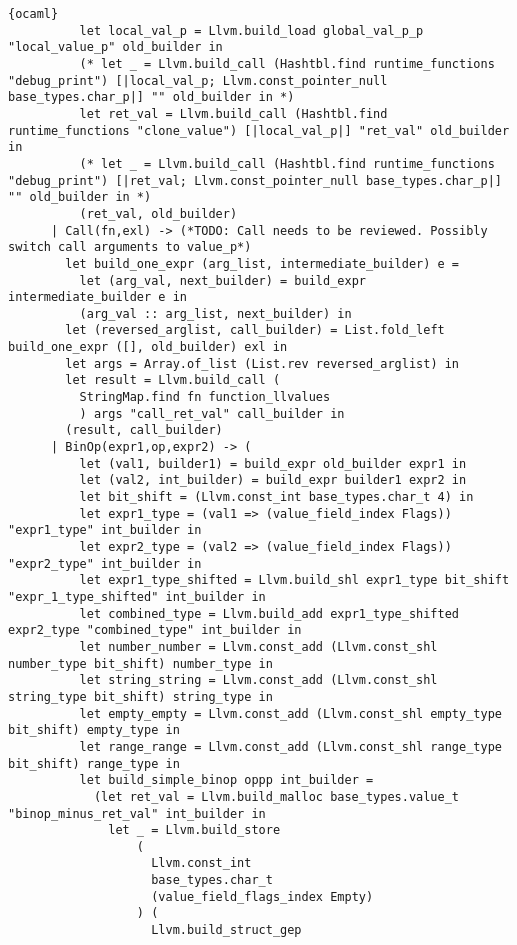 \begin{lstlisting}{ocaml}
          let local_val_p = Llvm.build_load global_val_p_p "local_value_p" old_builder in
          (* let _ = Llvm.build_call (Hashtbl.find runtime_functions "debug_print") [|local_val_p; Llvm.const_pointer_null base_types.char_p|] "" old_builder in *)
          let ret_val = Llvm.build_call (Hashtbl.find runtime_functions "clone_value") [|local_val_p|] "ret_val" old_builder in
          (* let _ = Llvm.build_call (Hashtbl.find runtime_functions "debug_print") [|ret_val; Llvm.const_pointer_null base_types.char_p|] "" old_builder in *)
          (ret_val, old_builder)
      | Call(fn,exl) -> (*TODO: Call needs to be reviewed. Possibly switch call arguments to value_p*)
        let build_one_expr (arg_list, intermediate_builder) e =
          let (arg_val, next_builder) = build_expr intermediate_builder e in
          (arg_val :: arg_list, next_builder) in
        let (reversed_arglist, call_builder) = List.fold_left build_one_expr ([], old_builder) exl in
        let args = Array.of_list (List.rev reversed_arglist) in
        let result = Llvm.build_call (
          StringMap.find fn function_llvalues
          ) args "call_ret_val" call_builder in
        (result, call_builder)
      | BinOp(expr1,op,expr2) -> (
          let (val1, builder1) = build_expr old_builder expr1 in
          let (val2, int_builder) = build_expr builder1 expr2 in
          let bit_shift = (Llvm.const_int base_types.char_t 4) in
          let expr1_type = (val1 => (value_field_index Flags)) "expr1_type" int_builder in
          let expr2_type = (val2 => (value_field_index Flags)) "expr2_type" int_builder in
          let expr1_type_shifted = Llvm.build_shl expr1_type bit_shift "expr_1_type_shifted" int_builder in
          let combined_type = Llvm.build_add expr1_type_shifted expr2_type "combined_type" int_builder in
          let number_number = Llvm.const_add (Llvm.const_shl number_type bit_shift) number_type in
          let string_string = Llvm.const_add (Llvm.const_shl string_type bit_shift) string_type in
          let empty_empty = Llvm.const_add (Llvm.const_shl empty_type bit_shift) empty_type in
          let range_range = Llvm.const_add (Llvm.const_shl range_type bit_shift) range_type in
          let build_simple_binop oppp int_builder =
            (let ret_val = Llvm.build_malloc base_types.value_t "binop_minus_ret_val" int_builder in
              let _ = Llvm.build_store
                  (
                    Llvm.const_int
                    base_types.char_t
                    (value_field_flags_index Empty)
                  ) (
                    Llvm.build_struct_gep

\end{lstlisting}
